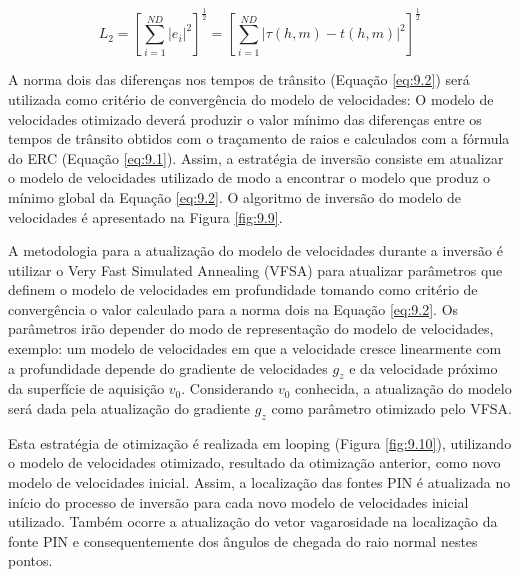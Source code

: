 \begin{equation}
\label{eq:9.6}
L_2 = \left[ \sum_{i=1}^{ND} |e_i|^2 \right]^\frac{1}{2}
= \left[ \sum_{i=1}^{ND} |\tau(h,m)-t(h,m)|^2 \right]^\frac{1}{2}
\end{equation}

A norma dois das diferenças nos tempos de trânsito (Equação \ref{eq:9.2})
será utilizada como critério de
convergência do modelo de velocidades: O modelo de velocidades otimizado deverá produzir
o valor mínimo das diferenças entre os tempos de trânsito obtidos com o traçamento de raios
e calculados com a fórmula do ERC (Equação \ref{eq:9.1}). Assim, a estratégia de inversão consiste em
atualizar o modelo de velocidades utilizado de modo a
encontrar o modelo que produz o mínimo global da Equação \ref{eq:9.2}. O algoritmo de inversão
do modelo de velocidades é apresentado na Figura \ref{fig:9.9}.

A metodologia para a atualização do modelo de velocidades durante a inversão é utilizar o
Very Fast Simulated Annealing (VFSA) para atualizar parâmetros que definem o modelo de velocidades
em profundidade tomando como critério de convergência o valor calculado para a norma dois na Equação
\ref{eq:9.2}. Os parâmetros irão depender do modo de representação do modelo de velocidades, exemplo:
um modelo de velocidades em que a velocidade cresce linearmente com a profundidade depende do gradiente
de velocidades $g_z$ e da velocidade próximo da superfície de aquisição $v_0$. Considerando $v_0$ conhecida,
a atualização do modelo será dada pela atualização do gradiente $g_z$ como parâmetro otimizado pelo VFSA.

Esta estratégia de otimização é realizada em looping (Figura \ref{fig:9.10}),
utilizando o modelo de velocidades otimizado, resultado
da otimização anterior, como novo modelo de velocidades inicial. Assim, a localização das fontes PIN é
atualizada no início do processo de inversão para cada novo modelo de velocidades inicial utilizado.
Também ocorre a atualização do vetor vagarosidade na localização da fonte PIN e consequentemente
dos ângulos de chegada do raio normal nestes pontos.


